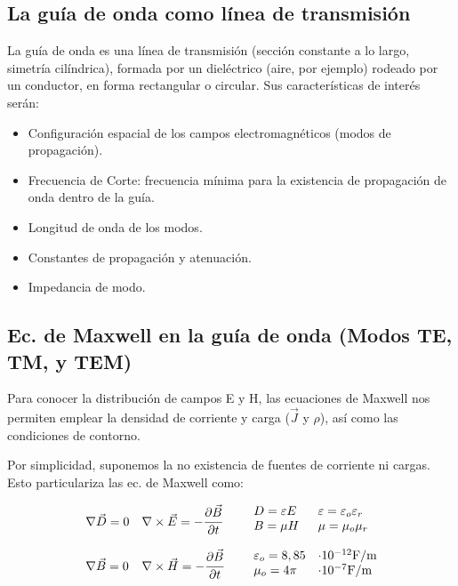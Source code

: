 \documentclass[12pt]{article}
\begin{document}
\subsection{La gu\'ia de onda como l\'inea de transmisi\'on}

La gu\'ia de onda es una l\'inea de transmisi\'on (secci\'on constante a lo largo, simetr\'ia cil\'indrica), formada por un diel\'ectrico (aire, por ejemplo) rodeado por un conductor, en forma rectangular o circular. Sus caracter\'isticas de inter\'es ser\'an:
\begin{itemize}
	\item Configuraci\'on espacial de los campos electromagn\'eticos (modos de propagaci\'on).
	\item Frecuencia de Corte: frecuencia m\'inima para la existencia de propagaci\'on de onda dentro de la gu\'ia.
	\item Longitud de onda de los modos.
	\item Constantes de propagaci\'on y atenuaci\'on.
	\item Impedancia de modo.
\end{itemize}

\subsection{Ec. de Maxwell en la gu\'ia de onda (Modos TE, TM, y TEM)}

Para conocer la distribuci\'on de campos E y H, las ecuaciones de Maxwell nos permiten emplear la densidad de corriente y carga ($\vec{J}$ y $\rho$), as\'i como las condiciones de contorno.

Por simplicidad, suponemos la no existencia de fuentes de corriente ni cargas. Esto particulariza las ec. de Maxwell como:

$$
\begin{array}{ll}
	\nabla \vec{D} = 0 & \nabla \times \vec{E} = - \cfrac{\partial \vec{B}}{\partial t}\\
	\\
	\nabla \vec{B} = 0 & \nabla \times \vec{H} = - \cfrac{\partial \vec{B}}{\partial t}
\end{array}
\hspace{0.5cm}
\begin{array}{ll}
	D = \varepsilon E    & \varepsilon = \varepsilon_o \varepsilon_r \\
	B = \mu H            & \mu = \mu_o \mu_r \\
	\\
	\varepsilon_o = 8,85 & \cdot 10^{-12} \text{F/m}\\
	\mu_o = 4\pi         & \cdot 10^{-7} \text{F/m}
\end{array}
$$
\end{document}
